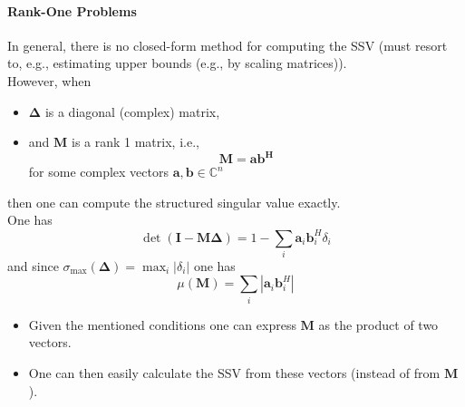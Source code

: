 \paragraph{Rank-One Problems}
In general, there is no closed-form method for computing the SSV (must resort to, e.g., estimating upper bounds (e.g., by scaling matrices)).\\
However, when
\begin{itemize}
    \item $\boldsymbol{\Delta}$ is a diagonal (complex) matrix,
    \item and $\mathbf{M}$ is a rank 1 matrix, i.e.,
          \begin{equation*}
              \mathbf{M}=\mathbf{ab^H}
          \end{equation*}
          for some complex vectors $\mathbf{a},\mathbf{b}\in \mathbb{C}^n$
\end{itemize}
then one can compute the structured singular value exactly.\\
One has
\begin{equation*}
    \det(\mathbf{I}-\mathbf{M}\boldsymbol{\Delta})=1-\sum_{i}\mathbf{a}_{i}\mathbf{b}_{i}^{H}\delta_{i}
\end{equation*}
and since $\sigma_{\max}(\boldsymbol{\Delta})=\max_i|\delta_i|$ one has
\begin{equation*}
    \mu(\mathbf{M})=\sum_i|\mathbf{a}_i \mathbf{b}_i^H|
\end{equation*}

\newpar{}
\begin{itemize}
    \item Given the mentioned conditions one can express $\mathbf{M}$ as the product of two vectors.
    \item One can then easily calculate the SSV from these vectors (instead of from $\mathbf{M}$).
\end{itemize}


